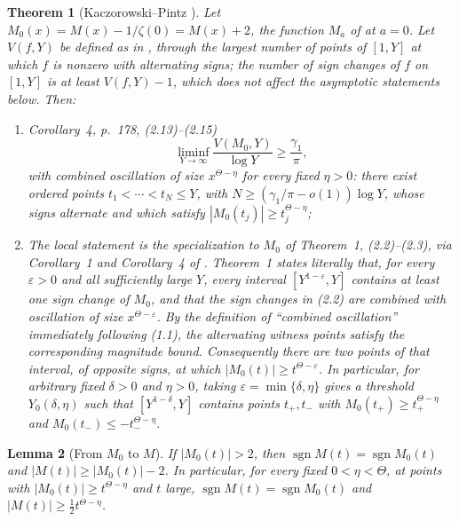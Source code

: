 \documentclass[11pt,reqno]{amsart}
\makeatletter
\let\CG@origcite\cite
\renewcommand*{\cite}[2][]{\def\CG@citekey{#2}%
  \ifx\relax#1\relax\CG@origcite{#2}\else\CG@origcite[#1]{#2}\fi}
\numberwithin{equation}{section}
\theoremstyle{plain}
\newtheorem{theorem}{Theorem}[section]
\newtheorem{lemma}[theorem]{Lemma}
\theoremstyle{definition}
\theoremstyle{remark}
\DeclareMathOperator{\sgn}{sgn}
\makeatother
\begin{document}
\begin{theorem}[Kaczorowski--Pintz {\cite{KP86}}]
\label{thm:KP-quoted}
Let $M_0(x)=M(x)-1/\zeta(0)=M(x)+2$, the function $M_a$ of \cite{KP86} at
$a=0$. Let $V(f,Y)$ be defined as in \cite{KP86}, through the largest number of
points of $[1,Y]$ at which $f$ is nonzero with alternating signs; the number
of sign changes of $f$ on $[1,Y]$ is at least $V(f,Y)-1$, which does not
affect the asymptotic statements below. Then:
\begin{enumerate}[label=\textup{(\roman*)}]
\item \cite[Corollary~4, p.~178, (2.13)--(2.15)]{KP86}
\begin{equation}
\label{eq:KP-signchanges}
\liminf_{Y\to\infty}\frac{V(M_0,Y)}{\log Y}\ge\frac{\gamma_1}{\pi},
\end{equation}
with combined oscillation of size $x^{\Theta-\eta}$ for every fixed
$\eta>0$: there exist ordered points $t_1<\cdots<t_N\le Y$, with
$N\ge(\gamma_1/\pi-o(1))\log Y$, whose signs alternate and which satisfy
$|M_0(t_j)|\ge t_j^{\Theta-\eta}$;
\item The local statement is the specialization to $M_0$ of
Theorem~1, (2.2)--(2.3), via Corollary~1 and Corollary~4 of \cite{KP86}.
Theorem~1 states literally that, for every $\varepsilon>0$ and all
sufficiently large $Y$, every interval $[Y^{1-\varepsilon},Y]$ contains at
least one sign change of $M_0$, and that the sign changes in (2.2) are
combined with oscillation of size $x^{\Theta-\varepsilon}$.  By the
definition of ``combined oscillation'' immediately following (1.1), the
alternating witness points satisfy the corresponding magnitude bound.
Consequently there are two points of that interval, of opposite signs, at
which $|M_0(t)|\ge t^{\Theta-\varepsilon}$.  In particular, for arbitrary fixed
$\delta>0$ and $\eta>0$, taking
$\varepsilon=\min\{\delta,\eta\}$ gives a threshold
$Y_0(\delta,\eta)$ such that $[Y^{1-\delta},Y]$ contains points $t_+,t_-$
with
$M_0(t_+)\ge t_+^{\Theta-\eta}$ and
$M_0(t_-)\le-t_-^{\Theta-\eta}$.
\end{enumerate}
\end{theorem}

\begin{lemma}[From $M_0$ to $M$]
\label{lem:KP-translation}
If $|M_0(t)|>2$, then $\sgn M(t)=\sgn M_0(t)$ and
$|M(t)|\ge|M_0(t)|-2$. In particular, for every fixed $0<\eta<\Theta$, at points with
$|M_0(t)|\ge t^{\Theta-\eta}$ and $t$ large,
$\sgn M(t)=\sgn M_0(t)$ and $|M(t)|\ge\frac12t^{\Theta-\eta}$.
\end{lemma}
\end{document}
